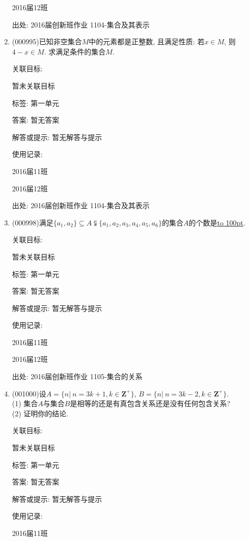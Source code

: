 \documentclass[10pt,a4paper]{article}
\newcommand{\blank}[1]{\underline{\hbox to #1pt{}}}
\begin{document}
\begin{enumerate}[1.]
2016届12班	


出处: 2016届创新班作业	1104-集合及其表示
\item { (000995)}已知非空集合$M$中的元素都是正整数, 且满足性质: 若$x\in M$, 则$4-x\in M$. 求满足条件的集合$M$.


关联目标:

暂未关联目标



标签: 第一单元

答案: 暂无答案

解答或提示: 暂无解答与提示

使用记录:

2016届11班	

2016届12班	


出处: 2016届创新班作业	1104-集合及其表示
\item { (000998)}满足$\{a_1,a_2\}\subseteq A\subsetneqq\{a_1,a_2,a_3,a_4,a_5,a_6\}$的集合$A$的个数是\blank{100}.


关联目标:

暂未关联目标



标签: 第一单元

答案: 暂无答案

解答或提示: 暂无解答与提示

使用记录:

2016届11班	

2016届12班	


出处: 2016届创新班作业	1105-集合的关系
\item { (001000)}设$A=\{n|\ n=3k+1,k \in \mathbf{Z}^+\}$, $B=\{n|\ n=3k-2,k \in \mathbf{Z}^+\}$.\\ 
(1) 集合$A$与集合$B$是相等的还是有真包含关系还是没有任何包含关系?\\ 
(2) 证明你的结论.


关联目标:

暂未关联目标



标签: 第一单元

答案: 暂无答案

解答或提示: 暂无解答与提示

使用记录:

2016届11班		


\end{enumerate}
\end{document}
